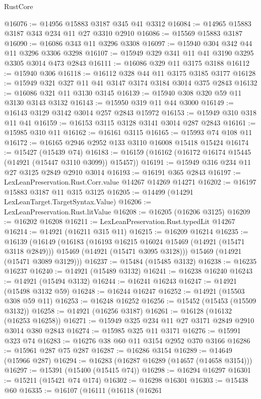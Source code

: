\begin{lexlean}{RustCore}
\begin{coremodule}
@16076 := @14956 @15883 @3187 @345 @41 @3312
@16084 := @14965 @15883 @3187 @343 @234 @11 @27 @3310 @2910
@16086 := @15569 @15883 @3187
@16090 := @16086 @343 @11 @3296 @3308
@16097 := @15940 @304 @342 @44 @11 @3296 @3306 @3298
@16107 := @15949 @329 @341 @11 @41 @3190 @3295 @3305 @3014 @473 @2843
@16111 := @16086 @329 @11 @3175 @3188
@16112 := @15940 @306
@16118 := @16112 @328 @44 @11 @3175 @3185 @3177
@16128 := @15949 @321 @327 @11 @41 @3147 @3174 @3184 @3014 @375 @2843
@16132 := @16086 @321 @11 @3130 @3145
@16139 := @15940 @308 @320 @59 @11 @3130 @3143 @3132
@16143 := @15950 @319 @11 @44 @3000
@16149 := @16143 @3129 @3142 @3014 @257 @2843 @15972
@16153 := @15949 @310 @318 @11 @41
@16159 := @16153 @3115 @3128 @3141 @3014 @287 @2843
@16161 := @15985 @310 @11
@16162 := @16161 @3115
@16165 := @15993 @74 @108 @11
@16172 := @16165 @2946 @2952 @133 @3110 @16008 @15418 @15424
@16174 := @15427 (@15439 @74)
@16183 := @16159 (@16162 (@16172 @16174 @15445 (@14921 (@15447 @3110 @3099)) @15457))
@16191 := @15949 @316 @234 @11 @27 @3125 @2849 @2910 @3014
@16193 := @16191 @365 @2843
@16197 := LexLeanPreservation.Rust.Corr.value @14267 @14269 @14271
@16202 := @16197 @15883 @3187 @11 @315 @3125
@16205 := @14499 (@14291 LexLeanTarget.TargetSyntax.Value)
@16206 := LexLeanPreservation.Rust.litValue
@16208 := @16205 (@16206 @3125)
@16209 := @16202 @16208
@16211 := LexLeanPreservation.Rust.typedLit @14267
@16214 := @14921 (@16211 @315 @11)
@16215 := @16209 @16214
@16235 := @16139
    (@16149
      (@16183
        (@16193 @16215 @16024 @15469 (@14921 (@15471 @3118 @2849)))
        @15469
        (@14921 (@15471 @3095 @3128)))
      @15469
      (@14921 (@15471 @3089 @3129)))
@16237 := @15484 (@15485 @3132)
@16238 := @16235 @16237
@16240 := @14921 (@15489 @3132)
@16241 := @16238 @16240
@16243 := @14921 (@15494 @3132)
@16244 := @16241 @16243
@16247 := @14921 (@15498 @3132 @59)
@16248 := @16244 @16247
@16252 := @14921 (@15503 @308 @59 @11)
@16253 := @16248 @16252
@16256 := @15452 (@15453 (@15509 @3132))
@16258 := @14921 (@16256 @3187)
@16261 := @16128 (@16132 (@16253 @16258))
@16271 := @15949 @325 @234 @11 @27 @3171 @2849 @2910 @3014 @380 @2843
@16274 := @15985 @325 @11 @3171
@16276 := @15991 @323 @74
@16283 := @16276 @38 @60 @11 @3154 @2952 @370 @3166
@16286 := @15961 @287 @75 @287
@16287 := @16286 @3154
@16289 := @14649 (@15966 @287)
@16294 := @16283 (@16287 @16289 (@14657 (@14658 @3154)))
@16297 := @15391 (@15400 (@15415 @74))
@16298 := @16294 @16297
@16301 := @15211 (@15421 @74 @174)
@16302 := @16298 @16301
@16303 := @15438 @60
@16335 := @16107
    (@16111
      (@16118
        (@16261

\end{coremodule}
\end{lexlean}
